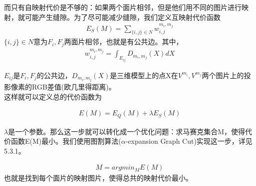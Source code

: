 \documentclass[11pt,a4,notitlepage]{article}
\begin{document}
\begin{CJK}{UTF8}{gkai}
而只有自映射代价是不够的：如果两个面片相邻，但是他们用不同的图片进行映射，就可能产生缝隙。为了尽可能减少缝隙，我们定义互映射代价函数
\begin{align} E_{S}(M) = \sum_{\{i,j\}^{}\in N} w_{i,j}^{m_{i},m_{j}} 	\end{align}
$\{i,j\} \in N$意为$F_{i},F_{j}$两面片相邻，也就是有公共边。其中，
\begin{align} w_{i,j}^{m_{i},m_{j}}=\int_{E_{ij}}^{}D_{m_{i},m_{j}}(X)dX	\end{align}

$E_{ij}$是$F_{i},F_{j}$的公共边，$D_{m_{i},m_{j}}(X)$是三维模型上的点X在$V^{m_{i}},V^{m_{j}}$两个图片上的投影像素的RGB差值(欧几里得距离)。\\
这样就可以定义总的代价函数为

 \begin{align}  E(M)=E_{Q}(M)+\lambda E_{S}(M)	\end{align}

$\lambda$是一个参数。那么这一步就可以转化成一个优化问题：求马赛克集合M，使得代价函数E(M)最小。我们使用图割算法($\alpha$-expansion Graph Cut)实现这一步，详见5.3.1。

 \begin{align} M=argmin_{M}E(M) 	\end{align}
也就是找到每个面片的映射图片，使得总共的映射代价最小。

\end{CJK}
\end{document}
